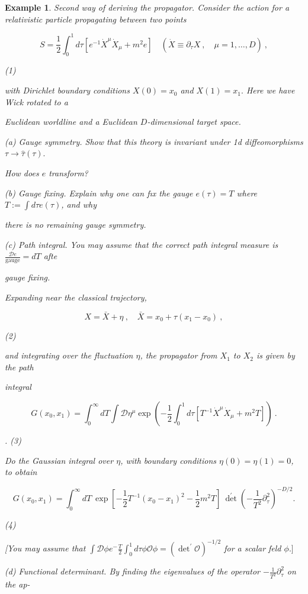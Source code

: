 \documentclass[10pt,
 article,
 amsmath,amssymb
]{revtex4-2}
\newtheorem{example}[theorem]{Example}
\begin{document}
\begin{example}
    Second way of deriving the propagator. Consider the action for a relativistic particle propagating between two points

$$S=\frac{1}{2}\int_0^1d\tau\left[e^{-1}\dot{X}^\mu\dot{X}_\mu+m^2e\right]\quad(\dot{X}\equiv\partial_\tau X\:,\quad\mu=1,\ldots,D)\:,$$

(1)


with Dirichlet boundary conditions $X(0)=x_0$ and $X(1)=x_1.$ Here we have Wick rotated to a

Euclidean worldline and a Euclidean $D$-dimensional target space.

(a) Gauge symmetry. Show that this theory is invariant under 1d diffeomorphisms $\tau\to\hat{\tau}(\tau).$

How does $e$ transform?

(b) Gauge fixing. Explain why one can fıx the gauge $e(\tau)=T$ where $T:=\int d\tau e(\tau)$, and why

there is no remaining gauge symmetry.

(c) Path integral. You may assume that the correct path integral measure is $\frac{\mathcal{D}e}{\mathrm{gauge}}=dT$ afte

gauge fixing.

Expanding near the classical trajectory,

$$X=\bar{X}+\eta\:,\quad\bar{X}=x_0+\tau(x_1-x_0)\:,$$

(2)

and integrating over the fluctuation $\eta$, the propagator from $X_1$ to $X_2$ is given by the path

integral

$$G(x_0,x_1)=\int_0^\infty dT\int\mathcal{D}\eta^\mu\exp\left(-\frac12\int_0^1d\tau\left[T^{-1}\dot{X}^\mu\dot{X}_\mu+m^2T\right]\right)\:.$$

. (3)

Do the Gaussian integral over $\eta$, with boundary conditions $\eta(0)=\eta(1)=0$, to obtain

$$G(x_0,x_1)=\int_0^\infty dT\:\exp\left[-\frac12T^{-1}(x_0-x_1)^2-\frac12m^2T\right]\:\det^{\prime}\left(-\frac1{T^2}\partial_\tau^2\right)^{-D/2}.$$

(4)

[You may assume that $\int\mathcal{D}\phi e^-\frac T2\int_0^1d\tau\phi{\mathcal{O}}\phi=(\det^{\prime}\mathcal{O})^{-1/2}$ for a scalar feld $\phi.]$

(d) Functional determinant. By finding the eigenvalues of the operator $-\frac1{T^2}\partial_\tau^2$ on the ap-


\end{example}
\end{document}
